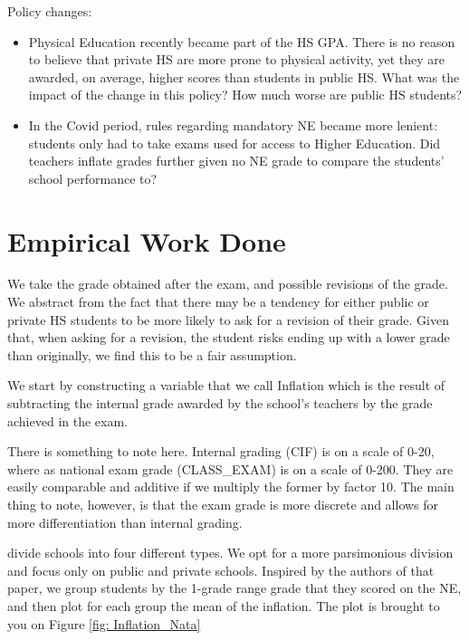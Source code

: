 \documentclass{article}
\begin{document}
Policy changes:

\begin{itemize}
    \item Physical Education recently became part of the HS GPA. There is no reason to believe that private HS are more prone to physical activity, yet %
    they are awarded, on average, higher scores than students in public HS. What was the impact of the change in this policy? How much worse are public HS students?
    \item In the Covid period, rules regarding mandatory NE became more lenient: students only had to take exams used for access to Higher Education. Did teachers inflate grades further given no NE grade to compare the students' school performance to?
\end{itemize}

\section{Empirical Work Done}
We take the grade obtained after the exam, and possible revisions of the grade. We abstract from the fact that there may be a tendency for either public or private HS students to be more likely to ask for a revision of their grade. Given that, when asking for a revision, the student risks ending up with a lower grade than originally, we find this to be a fair assumption.

We start by constructing a variable that we call Inflation which is the result of subtracting the internal grade awarded by the school's teachers by the grade achieved in the exam.

There is something to note here. Internal grading (CIF) is on a scale of 0-20, where as national exam grade (CLASS\_EXAM) is on a scale of 0-200. They are easily comparable and additive if we multiply the former by factor 10. The main thing to note, however, is that the exam grade is more discrete and allows for more differentiation than internal grading.

\cite{nata2014unfairness} divide schools into four different types. We opt for a more parsimonious division and focus only on public and private schools. Inspired by the authors of that paper, we group students by the 1-grade range grade that they scored on the NE, and then plot for each group the mean of the inflation. The plot is brought to you on Figure \ref{fig: Inflation_Nata}
\end{document}
